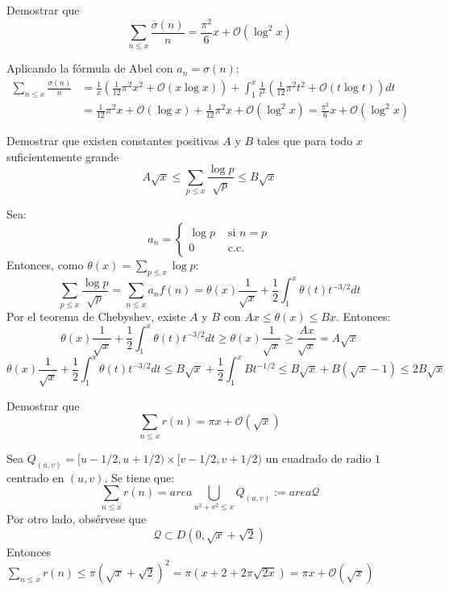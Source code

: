 \documentclass[twoside]{article}
\begin{document}
\begin{ejercicio}{8}
Demostrar que
\[ \sum_{n≤x} \frac{σ(n)}{n} = \frac{π^2}{6} x + \mathcal{O}(\log^2 x) \]
\end{ejercicio}
\begin{solucion}
Aplicando la fórmula de Abel con $a_n = σ(n)$:
\begin{align*}
	\sum_{n≤x} \frac{σ(n)}{n} & = \frac{1}{x}\left(\frac{1}{12}π^2x^2 + \mathcal{O}(x \log x)\right) + \int_1^x \frac{1}{t^2}\left(\frac{1}{12}π^2t^2 + \mathcal{O}(t \log t)\right)dt\\
	& = \frac{1}{12}π^2x + \mathcal{O}(\log x) + \frac{1}{12}π^2x + \mathcal{O}(\log^2 x) = \frac{π^2}{6}x + \mathcal{O}(\log^2 x)
\end{align*}
\end{solucion}

\newpage

\begin{ejercicio}{9}
Demostrar que existen constantes positivas $A$ y $B$ tales que para todo $x$ suficientemente grande
\[ A\sqrt{x} ≤ \sum_{p≤x} \frac{\log p}{\sqrt{p}} ≤ B \sqrt{x}\]
\end{ejercicio}
\begin{solucion}
Sea:
\[ a_n = \begin{cases}
	\log p &\text{ si }n = p\\
	0 & \text{ c.c.}
\end{cases}\]
Entonces, como $θ(x) = \sum_{p≤x} \log p$:
\[ \sum_{p≤x} \frac{\log p}{\sqrt{p}}  = \sum_{n≤x} a_n f(n) = θ(x) \frac{1}{\sqrt{x}} + \frac{1}{2} \int_1^x θ(t) t^{-3/2} dt \]
Por el teorema de Chebyshev, existe $A$ y $B$ con $Ax ≤ θ(x) ≤ Bx$. Entonces:
\[ θ(x) \frac{1}{\sqrt{x}} + \frac{1}{2} \int_1^x θ(t) t^{-3/2} dt ≥ θ(x) \frac{1}{\sqrt{x}} ≥ \frac{Ax}{\sqrt{x}} = A\sqrt{x}\]
\[ θ(x) \frac{1}{\sqrt{x}} + \frac{1}{2} \int_1^x θ(t) t^{-3/2} dt ≤ B\sqrt{x} + \frac{1}{2} \int_1^x Bt^{-1/2} ≤ B\sqrt{x}+B(\sqrt{x}-1) ≤ 2B \sqrt{x} \]
\end{solucion}

\newpage

\begin{ejercicio}{10}
Demostrar que
\[ \sum_{n≤x} r(n) = πx + \mathcal{O}(\sqrt{x}) \]
\end{ejercicio}
\begin{solucion}
Sea $Q_{(u,v)}=[u-1/2,u+1/2)\times[v-1/2,v+1/2)$ un cuadrado de radio $1$ centrado en $(u,v)$. Se tiene que:
\[ \sum_{n≤x} r(n) = area \bigcup_{u^2+v^2≤x} Q_{(u,v)} := area \mathcal{Q} \]
Por otro lado, obsérvese que
\[ \mathcal{Q} \subset D(0,\sqrt{x}+\sqrt{2}) \]
Entonces $\sum_{n≤x} r(n) ≤ π(\sqrt{x}+\sqrt{2})^2 = π(x+2+2π\sqrt{2x}) = πx + \mathcal{O}(\sqrt{x})$
\end{solucion}
\end{document}
